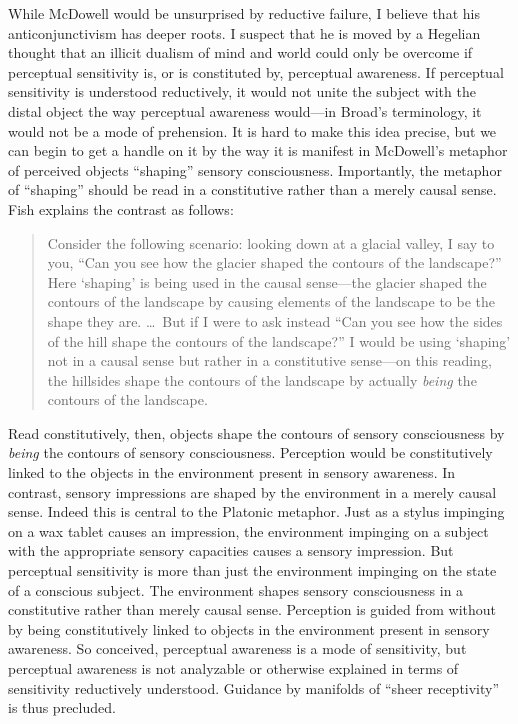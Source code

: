 \documentclass[12pt]{article}
\begin{document}
While McDowell would be unsurprised by reductive failure, I believe that his anticonjunctivism has deeper roots. I suspect that he is moved by a Hegelian thought that an illicit dualism of mind and world could only be overcome if perceptual sensitivity is, or is constituted by, perceptual awareness. If perceptual sensitivity is understood reductively, it would not unite the subject with the distal object the way perceptual awareness would---in Broad's \citeyearpar{Broad:1965dq} terminology, it would not be a mode of prehension. It is hard to make this idea precise, but we can begin to get a handle on it by the way it is manifest in McDowell's metaphor of perceived objects ``shaping'' sensory consciousness. Importantly, the metaphor of ``shaping'' should be read in a constitutive rather than a merely causal sense. Fish explains the contrast as follows:
\begin{quote}
	Consider the following scenario: looking down at a glacial valley, I say to you, ``Can you see how the glacier shaped the contours of the landscape?'' Here `shaping' is being used in the causal sense---the glacier shaped the contours of the landscape by causing elements of the landscape to be the shape they are. \ldots\ But if I were to ask instead ``Can you see how the sides of the hill shape the contours of the landscape?'' I would be using `shaping' not in a causal sense but rather in a constitutive sense---on this reading, the hillsides shape the contours of the landscape by actually \emph{being} the contours of the landscape. \citep[6]{Fish:2009fk}
\end{quote}
Read constitutively, then, objects shape the contours of sensory consciousness by \emph{being} the contours of sensory consciousness. Perception would be constitutively linked to the objects in the environment present in sensory awareness. In contrast, sensory impressions are shaped by the environment in a merely causal sense. Indeed this is central to the Platonic metaphor. Just as a stylus impinging on a wax tablet causes an impression, the environment impinging on a subject with the appropriate sensory capacities causes a sensory impression. But perceptual sensitivity is more than just the environment impinging on the state of a conscious subject. The environment shapes sensory consciousness in a constitutive rather than merely causal sense. Perception is guided from without by being constitutively linked to objects in the environment present in sensory awareness. So conceived, perceptual awareness is a mode of sensitivity, but perceptual awareness is not analyzable or otherwise explained in terms of sensitivity reductively understood. Guidance by manifolds of ``sheer receptivity'' is thus precluded.
\end{document}
